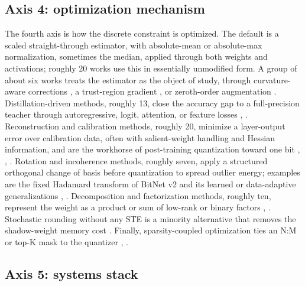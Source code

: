 \documentclass[11pt]{article}
\begin{document}
\subsection{Axis 4: optimization mechanism}

The fourth axis is how the discrete constraint is optimized. The default is a scaled
straight-through estimator, with absolute-mean or absolute-max normalization, sometimes
the median, applied through both weights and activations; roughly 20 works use this in
essentially unmodified form. A group of about six works treats the estimator as the
object of study, through curvature-aware corrections \cite{Tabesh2025-CAGE}, a trust-region
gradient \cite{Panferov2025-QuEST}, or zeroth-order augmentation \cite{Anon2025-STE-ZerothOrder}.
Distillation-driven methods, roughly 13, close the accuracy gap to a full-precision
teacher through autoregressive, logit, attention, or feature losses \cite{Ma2024-FBILLM},
\cite{Wu2025-BitNetDistillation,Du2024-BitDistiller,Tang2024-BiMamba}. Reconstruction
and calibration methods, roughly 20, minimize a layer-output error over calibration
data, often with salient-weight handling and Hessian information, and are the workhorse
of post-training quantization toward one bit \cite{Huang2024-BiLLM,Li2024-ARBLLM},
\cite{Xiao2025-PTQTP,Li2025-ICQuant,Xu2024-CRVQ,Edalati2024-OAC},
\cite{Xiao2025-LieQ,Abdalla2026-SAGEPTQ}. Rotation and incoherence methods, roughly seven,
apply a structured orthogonal change of basis before quantization to spread outlier
energy; examples are the fixed Hadamard transform of BitNet v2 \cite{Wang2025-BitNetV2} and
its learned or data-adaptive generalizations \cite{Zagitov2026-HARP,Zhao2026-TWLA},
\cite{Pavlov2026-InfluenceRotations}. Decomposition and factorization methods, roughly ten,
represent the weight as a product or sum of low-rank or binary factors \cite{Xu2024-OneBit},
\cite{Lee2025-LittleBit,Xiao2025-PTQTP,Wang2026-LCQAT}. Stochastic rounding without any
STE is a minority alternative that removes the shadow-weight memory cost
\cite{Zhao2024-DQT}. Finally, sparsity-coupled optimization ties an N:M or top-K mask to the
quantizer \cite{Zhang2026-SparseBitNet,Huang2026-Sherry,Dong2024-STBLLM},
\cite{Wang2024-QSparse}.

\subsection{Axis 5: systems stack}
\end{document}

